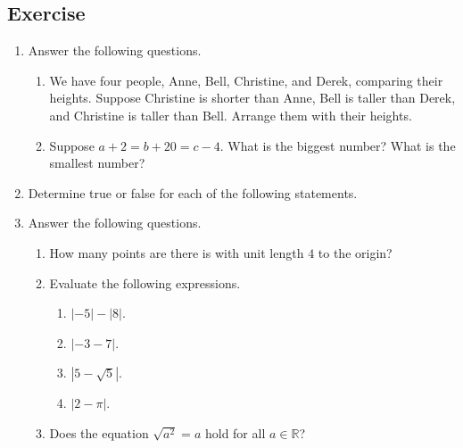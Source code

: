 \documentclass[11pt]{book}
\theoremstyle{break}
\theoremstyle{no_label}
\newcommand{\bbR}{\mathbb{R}}
\numberwithin{equation}{section}
\begin{document}
\subsection*{Exercise}
\begin{enumerate}[label=\arabic*.]
    \item Answer the following questions.
    \begin{enumerate}
        \item We have four people, Anne, Bell, Christine, and Derek, comparing their heights. Suppose Christine is shorter than Anne, Bell is taller than Derek, and Christine is taller than Bell. Arrange them with their heights.
        \item Suppose $a+2=b+20=c-4$. What is the biggest number? What is the smallest number?
    \end{enumerate}
    \item Determine true or false for each of the following statements.
    \begin{enumerate}
    \end{enumerate}
    \item Answer the following questions.
    \begin{enumerate}
        \item How many points are there is with unit length $4$ to the origin?
        \item Evaluate the following expressions.
        \begin{multicols}{4}
            \begin{enumerate}[label=\alph*.]
                \item $|-5|-|8|$.
                \item $|-3-7|$.
                \item $|5-\sqrt{5}|$.
                \item $|2-\pi|$.
            \end{enumerate}
        \end{multicols}
        \item Does the equation $\sqrt{a^2}=a$ hold for all $a\in\bbR$?

\end{enumerate}
\end{enumerate}
\end{document}
